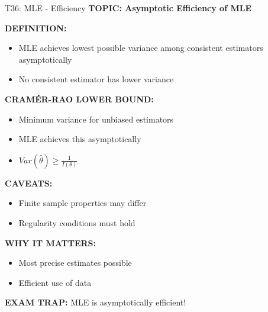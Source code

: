 \documentclass[8pt]{beamer}
\begin{document}
	\begin{frame}{T36: MLE - Efficiency}
		\fontsize{6.5}{7.5}\selectfont
		\textbf{TOPIC: Asymptotic Efficiency of MLE}
		
		\vspace{0.1cm}
		\textbf{DEFINITION:}
		\begin{itemize}
			\item MLE achieves lowest possible variance among consistent estimators asymptotically
			\item No consistent estimator has lower variance
		\end{itemize}
		
		\vspace{0.1cm}
		\textbf{CRAMÉR-RAO LOWER BOUND:}
		\begin{itemize}
			\item Minimum variance for unbiased estimators
			\item MLE achieves this asymptotically
			\item $Var(\hat{\theta}) \geq \frac{1}{I(\theta)}$
		\end{itemize}
		
		\vspace{0.1cm}
		\textbf{CAVEATS:}
		\begin{itemize}
			\item Finite sample properties may differ
			\item Regularity conditions must hold
		\end{itemize}
		
		\vspace{0.1cm}
		\textbf{WHY IT MATTERS:}
		\begin{itemize}
			\item Most precise estimates possible
			\item Efficient use of data
		\end{itemize}
		
		\textcolor{myred}{\textbf{EXAM TRAP:}} MLE is \textcolor{myblue}{asymptotically efficient}!
	\end{frame}
	
\end{document}
